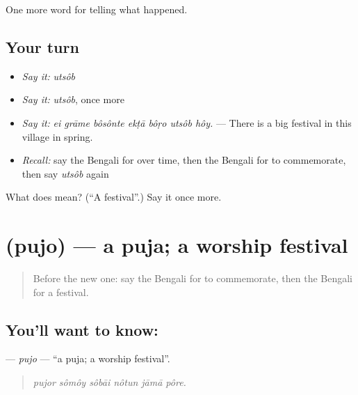 \begin{grammarlens}[title={What you've built}]
One more word for telling what happened.
\end{grammarlens}

\subsection*{Your turn}
\begin{itemize}
\raggedright
  \item \emph{Say it:} \emph{utsôb}
  \item \emph{Say it:} \emph{utsôb}, once more
  \item \emph{Say it:} \emph{ei grāme bôsônte ekṭā bôṛo utsôb hôy.} — There is a big festival in this village in spring.
  \item \emph{Recall:} say the Bengali for over time, then the Bengali for to commemorate, then say \emph{utsôb} again
\end{itemize}

\begin{tcolorbox}[breakable,colback=teal!4,colframe=teal!35!black,title={Before you move on}]
What does  mean? (\textquotedblleft{}A festival\textquotedblright{}.) Say it once more.
\end{tcolorbox}
\section[\texorpdfstring{\bn{পুজো} (pujo)}{পুজো (pujo)}]{ (pujo) — a puja; a worship festival}

\label{lesson:BN-C304-pujo}



\begin{quote}
Before the new one: say the Bengali for to commemorate, then the Bengali for a festival.
\end{quote}

\subsection*{You'll want to know: }
\textbf{} — \emph{pujo} — \textquotedblleft{}a puja; a worship festival\textquotedblright{}.

\begin{quote}
     
\end{quote}

\begin{quote}
\emph{pujor sômôy sôbāi nôtun jāmā pôre.}
\end{quote}

